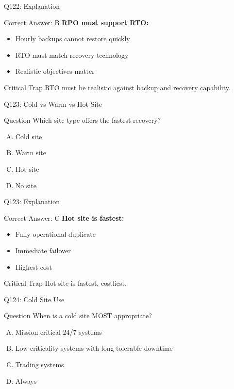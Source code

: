 \documentclass{beamer}
\begin{document}
	\begin{frame}{Q122: Explanation}
		\begin{block}{Correct Answer: B}
			\textbf{RPO must support RTO:}
			\begin{itemize}
				\item Hourly backups cannot restore quickly
				\item RTO must match recovery technology
				\item Realistic objectives matter
			\end{itemize}
		\end{block}
		\begin{alertblock}{Critical Trap}
			RTO must be realistic against backup and recovery capability.
		\end{alertblock}
	\end{frame}
	
	\begin{frame}{Q123: Cold vs Warm vs Hot Site}
		\begin{block}{Question}
			Which site type offers the fastest recovery?
		\end{block}
		\begin{enumerate}[(A)]
			\item Cold site
			\item Warm site
			\item Hot site
			\item No site
		\end{enumerate}
	\end{frame}
	
	\begin{frame}{Q123: Explanation}
		\begin{block}{Correct Answer: C}
			\textbf{Hot site is fastest:}
			\begin{itemize}
				\item Fully operational duplicate
				\item Immediate failover
				\item Highest cost
			\end{itemize}
		\end{block}
		\begin{alertblock}{Critical Trap}
			Hot site is fastest, costliest.
		\end{alertblock}
	\end{frame}
	
	\begin{frame}{Q124: Cold Site Use}
		\begin{block}{Question}
			When is a cold site MOST appropriate?
		\end{block}
		\begin{enumerate}[(A)]
			\item Mission-critical 24/7 systems
			\item Low-criticality systems with long tolerable downtime
			\item Trading systems
			\item Always
		\end{enumerate}
	\end{frame}
	
\end{document}
